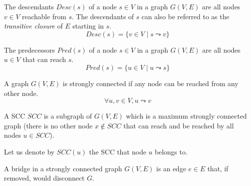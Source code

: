 \begin{definition}[Descendants] \label{def:desc} The descendants $Desc(s)$ of a node $s \in V$ in a graph $G(V,E)$ are all nodes $v \in V$ reachable from $s$. The descendants of $s$ can also be referred to as the \emph{transitive closure} of $E$ starting in $s$.
    \begin{equation*}
        Desc(s) = \{v \in V \mid s \leadsto v\}
    \end{equation*}
\end{definition}
\begin{definition}[Predecessors] The predecessors $Pred(s)$ of a node $s \in V$ in a graph $G(V,E)$ are all nodes $u \in V$ that can reach $s$.
    \begin{equation*}
        Pred(s) = \{u \in V \mid u \leadsto s\}
    \end{equation*}
\end{definition}
\begin{definition}
    A graph $G(V, E)$ is strongly connected if any node can be reached from any other node.
    \begin{equation*}
        \forall u, v \in V, u \leadsto v
    \end{equation*}
\end{definition}
\begin{definition}
    A \acrlong*{SCC} $SCC$ is a subgraph of $G(V, E)$ which is a maximum strongly connected graph (there is no other node $x \not \in SCC$ that can reach and be reached by all nodes $u \in SCC$).
\end{definition}
Let us denote by $SCC(u)$ the \acrfull{SCC} that node $u$ belongs to.
\begin{definition}[Bridge]
    A bridge in a strongly connected graph $G(V,E)$ is an edge $e \in E$ that, if removed, would disconnect $G$.
\end{definition}
